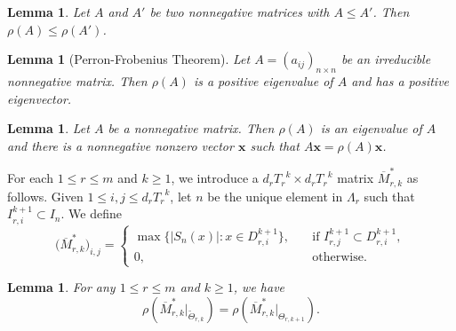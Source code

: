 \documentclass[11pt]{amsart}
\newtheorem{lem}[thm]{Lemma}
\theoremstyle{definition}
\theoremstyle{remark}
\numberwithin{equation}{section}
\newcommand{\bfx}{{\mathbf x}}
\newcommand{\upM}{{\overline{M}}}
\def\wdt{\widetilde}
\begin{document}
\begin{lem}\label{lem:SptlRadIncr-Nonngtv}
	Let $A$ and $A'$ be two nonnegative matrices with $A\leq A'$. Then $\rho(A)\leq \rho(A')$.
\end{lem}

\begin{lem}[Perron-Frobenius Theorem]\label{th:PF}
Let $A=(a_{ij})_{n\times n}$ be an irreducible nonnegative matrix. Then $\rho(A)$ is a positive eigenvalue of $A$ and has a positive eigenvector.
\end{lem}






\begin{lem}\label{lem:PFN}
Let $A$ be a nonnegative matrix. 
Then $\rho(A)$ is an eigenvalue of $A$ and there
is a nonnegative nonzero vector $\bfx$ such that $A\bfx  = \rho(A)\bfx$.

\end{lem}



For each $1\leq r\leq m$ and $k \geq 1$, we introduce a $d_r {T_r}^k \times d_r {T_r}^k$ matrix $\upM_{r,k}^*$ as follows. Given $1\leq i ,j \leq d_r {T_r}^{k}$, let $n$ be the unique element in $\Lambda_r$ such that $I_{r,i}^{k+1} \subset I_n$. We define
\begin{equation*}
	\big(\upM_{r,k}^*\big)_{i,j}= 
	\begin{cases}
		\max \big\{ \big| S_n(x) \big|: x \in D_{r,i}^{k+1}\big\} ,\quad & \mbox{if } I_{r,j}^{k+1}\subset D_{r,i}^{k+1}, \\
		0, \quad & \mbox{otherwise}.
	\end{cases}
\end{equation*}




	\begin{lem}\label{lem:new-eq}
	For any $1 \leq r \leq m$ and $k \geq 1$, we have
		$$
		\rho(\upM_{r,k}^*|_{\wdt{\Theta}_{r,k}}) = \rho(\upM_{r,k}^*|_{\Theta_{r,k+1}}).	
		$$
	\end{lem}
\end{document}
